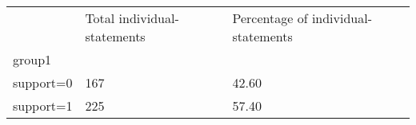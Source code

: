 \documentclass{article}
\begin{document}
\begin{table}[!h]
\centering
\begin{tabular}{lll}
\cline{1-3}
\multicolumn{1}{|l}{} &
  \multicolumn{1}{|l}{Total individual-statements} &
  \multicolumn{1}{|l|}{Percentage of individual-statements} \\
\cline{1-3}
\multicolumn{1}{|l}{group1} &
  \multicolumn{1}{|l}{} &
  \multicolumn{1}{|l|}{} \\
\cline{1-3}
\multicolumn{1}{|l}{support=0} &
  \multicolumn{1}{|l}{167} &
  \multicolumn{1}{|l|}{42.60} \\
\cline{1-3}
\multicolumn{1}{|l}{support=1} &
  \multicolumn{1}{|l}{225} &
  \multicolumn{1}{|l|}{57.40} \\
\cline{1-3}
\end{tabular}
\end{table}
\end{document}
